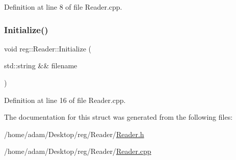Definition at line 8 of file Reader.\+cpp.

\mbox{\label{structreg_1_1_reader_ac537416d01e0f7ed72506126de45c54c}} 
\subsubsection{\texorpdfstring{Initialize()}{Initialize()}}
{\footnotesize\ttfamily void reg\+::\+Reader\+::\+Initialize (\begin{DoxyParamCaption}\item[{std\+::string \&\&}]{filename }\end{DoxyParamCaption})}



Definition at line 16 of file Reader.\+cpp.



The documentation for this struct was generated from the following files\+:\begin{DoxyCompactItemize}
\item 
/home/adam/\+Desktop/reg/\+Reader/\hyperlink{_reader_8h}{Reader.\+h}\item 
/home/adam/\+Desktop/reg/\+Reader/\hyperlink{_reader_8cpp}{Reader.\+cpp}\end{DoxyCompactItemize}

